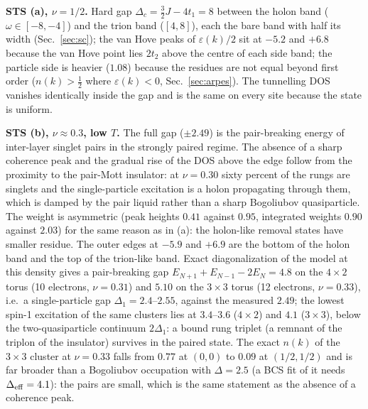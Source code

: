 \documentclass[11pt]{article}
\newcommand{\nuh}{\nu=1/2}
\newcommand{\nut}{\nu\approx0.3}
\begin{document}
\textbf{STS (a), $\nuh$.} Hard gap $\Delta_c=\tfrac32J-4t_1=8$ between the holon band ($\omega\in[-8,-4]$) and the trion band ($[4,8]$), each the bare band with half its width (Sec.~\ref{sec:sc}); the van Hove peaks of $\varepsilon(k)/2$ sit at $-5.2$ and $+6.8$ because the van Hove point lies $2t_2$ above the centre of each side band; the particle side is heavier ($1.08$) because the residues are not equal beyond first order ($n(k)>\tfrac12$ where $\varepsilon(k)<0$, Sec.~\ref{sec:arpes}). The tunnelling DOS vanishes identically inside the gap and is the same on every site because the state is uniform.

\textbf{STS (b), $\nut$, low $T$.} The full gap ($\pm2.49$) is the pair-breaking energy of inter-layer singlet pairs in the strongly paired regime. The absence of a sharp coherence peak and the gradual rise of the DOS above the edge follow from the proximity to the pair-Mott insulator: at $\nu=0.30$ sixty percent of the rungs are singlets and the single-particle excitation is a holon propagating through them, which is damped by the pair liquid rather than a sharp Bogoliubov quasiparticle. The weight is asymmetric (peak heights $0.41$ against $0.95$, integrated weights $0.90$ against $2.03$) for the same reason as in (a): the holon-like removal states have smaller residue. The outer edges at $-5.9$ and $+6.9$ are the bottom of the holon band and the top of the trion-like band. Exact diagonalization of the model at this density gives a pair-breaking gap $E_{N+1}+E_{N-1}-2E_N=4.8$ on the $4\times2$ torus (10 electrons, $\nu=0.31$) and $5.10$ on the $3\times3$ torus (12 electrons, $\nu=0.33$), i.e.\ a single-particle gap $\Delta_1=2.4$--$2.55$, against the measured $2.49$; the lowest spin-1 excitation of the same clusters lies at $3.4$--$3.6$ ($4\times2$) and $4.1$ ($3\times3$), below the two-quasiparticle continuum $2\Delta_1$: a bound rung triplet (a remnant of the triplon of the insulator) survives in the paired state. The exact $n(k)$ of the $3\times3$ cluster at $\nu=0.33$ falls from $0.77$ at $(0,0)$ to $0.09$ at $(1/2,1/2)$ and is far broader than a Bogoliubov occupation with $\Delta=2.5$ (a BCS fit of it needs $\Delta_{\rm eff}=4.1$): the pairs are small, which is the same statement as the absence of a coherence peak.
\end{document}
